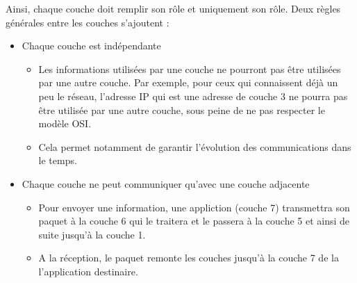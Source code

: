 Ainsi, chaque couche doit remplir son rôle et uniquement son rôle. Deux règles générales entre les couches s'ajoutent :
\begin{itemize}
  \item Chaque couche est indépendante
  \begin{itemize}
    \item Les informations utilisées par une couche ne pourront pas être utilisées par une autre couche.
Par exemple, pour ceux qui connaissent déjà un peu le réseau, l'adresse IP qui est une adresse de couche 3 ne pourra pas être utilisée par une autre couche, sous peine de ne pas respecter le modèle OSI.
  \item Cela permet notamment de garantir l'évolution des communications dans le temps.
  \end{itemize}
  \item Chaque couche ne peut communiquer qu'avec une couche adjacente
  \begin{itemize}
    \item Pour envoyer une information, une appliction (couche 7) transmettra son paquet à la couche 6 qui le traitera et le passera à la couche 5 et ainsi de suite jusqu'à la couche 1.
    \item A la réception, le paquet remonte les couches jusqu'à la couche 7 de la l'application destinaire.
  \end{itemize}
\end{itemize}
